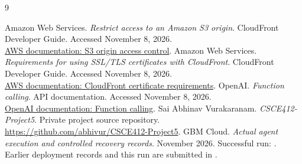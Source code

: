 \documentclass[11pt]{article}
\begin{document}
\begin{thebibliography}{9}
 Amazon Web Services. \emph{Restrict access to an Amazon S3 origin}. CloudFront Developer Guide. Accessed November 8, 2026.\\
\href{https://docs.aws.amazon.com/AmazonCloudFront/latest/DeveloperGuide/private-content-restricting-access-to-s3.html}{AWS documentation: S3 origin access control}.
 Amazon Web Services. \emph{Requirements for using SSL/TLS certificates with CloudFront}. CloudFront Developer Guide. Accessed November 8, 2026.\\
\href{https://docs.aws.amazon.com/AmazonCloudFront/latest/DeveloperGuide/cnames-and-https-requirements.html}{AWS documentation: CloudFront certificate requirements}.
 OpenAI. \emph{Function calling}. API documentation. Accessed November 8, 2026.\\
\href{https://developers.openai.com/api/docs/guides/function-calling}{OpenAI documentation: Function calling}.
 Sai Abhinav Vurakaranam. \emph{CSCE412-Project5}. Private project source repository.\\
\url{https://github.com/abhivur/CSCE412-Project5}.
 GBM Cloud. \emph{Actual agent execution and controlled recovery records}. November 2026. Successful run: . Earlier deployment records and this run are submitted in .
\end{thebibliography}
\end{document}
